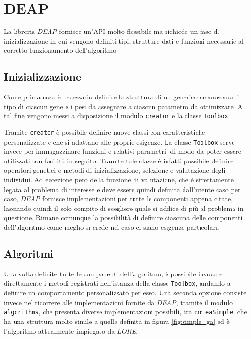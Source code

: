 \section{DEAP}

La libreria \textit{DEAP} fornisce un'API molto flessibile ma richiede un fase
di inizializzazione in cui vengono definiti tipi, strutture dati e funzioni
necessarie al corretto funzionamento dell'algoritmo.

\subsection{Inizializzazione}

Come prima cosa è necessario definire la struttura di un generico cromosoma, il
tipo di ciascun gene e i pesi da assegnare a ciascun parametro da ottimizzare.
A tal fine vengono messi a disposizione il modulo \verb|creator| e la classe
\verb|Toolbox|.

Tramite \verb|creator| è possibile definire nuove classi con caratteristiche
personalizzate e che si adattano alle proprie esigenze. La classe \verb|Toolbox|
serve invece per immagazzinare funzioni e relativi parametri, di modo da poter
essere utilizzati con facilità in seguito. Tramite tale classe è infatti
possibile definire operatori genetici e metodi di inizializzazione, selezione e
valutazione degli individui. Ad eccezione però della funzione di valutazione,
che è strettamente legata al problema di interesse e deve essere quindi definita
dall'utente caso per caso, \textit{DEAP} fornisce implementazioni per tutte le
componenti appena citate, lasciando quindi il solo compito di scegliere quale
si addice di più al problema in questione. Rimane comunque la possibilità di
definire ciascuna delle componenti dell'algoritmo come meglio si crede nel caso
ci siano esigenze particolari.

\subsection{Algoritmi}

Una volta definite tutte le componenti dell'algoritmo, è possibile invocare
direttamente i metodi registrati nell'istanza della classe \verb|Toolbox|,
andando a definire un comportamento personalizzato per esso. Una seconda opzione
consiste invece nel ricorrere alle implementazioni fornite da \textit{DEAP},
tramite il modulo \verb|algorithms|, che presenta diverse implementazioni
possibili, tra cui \verb|eaSimple|, che ha una struttura molto simile a quella
definita in figura \ref{fig:simple_ga} ed è l'algoritmo attualmente impiegato
da \textit{LORE}.

